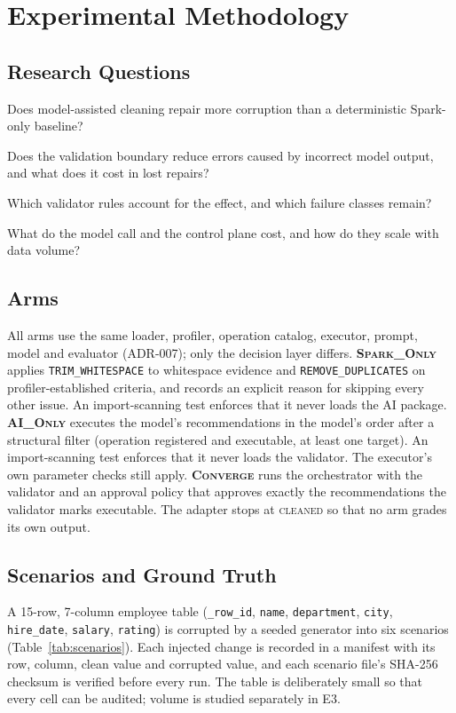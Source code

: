 \section{Experimental Methodology}
\label{sec:method}
\subsection{Research Questions}
\begin{description}[leftmargin=*,nosep,font=\normalfont\bfseries]
  \item[RQ1] Does model-assisted cleaning repair more corruption than a deterministic Spark-only baseline?
  \item[RQ2] Does the validation boundary reduce errors caused by incorrect model output, and what does it cost in lost repairs?
  \item[RQ3] Which validator rules account for the effect, and which failure classes remain?
  \item[RQ4] What do the model call and the control plane cost, and how do they scale with data volume?
\end{description}

\subsection{Arms}
All arms use the same loader, profiler, operation catalog, executor, prompt, model and evaluator (ADR-007); only the decision layer differs.
\textbf{\textsc{Spark\_Only}} applies \texttt{TRIM\_WHITESPACE} to whitespace evidence and \texttt{REMOVE\_DUPLICATES} on profiler-established criteria, and records an explicit reason for skipping every other issue. An import-scanning test enforces that it never loads the AI package.
\textbf{\textsc{AI\_Only}} executes the model's recommendations in the model's order after a structural filter (operation registered and executable, at least one target). An import-scanning test enforces that it never loads the validator. The executor's own parameter checks still apply.
\textbf{\textsc{Converge}} runs the orchestrator with the validator and an approval policy that approves exactly the recommendations the validator marks executable. The adapter stops at \textsc{cleaned} so that no arm grades its own output.

\subsection{Scenarios and Ground Truth}
A 15-row, 7-column employee table (\texttt{\_row\_id}, \texttt{name}, \texttt{department}, \texttt{city}, \texttt{hire\_date}, \texttt{salary}, \texttt{rating}) is corrupted by a seeded generator into six scenarios (Table~\ref{tab:scenarios}). Each injected change is recorded in a manifest with its row, column, clean value and corrupted value, and each scenario file's SHA-256 checksum is verified before every run. The table is deliberately small so that every cell can be audited; volume is studied separately in E3.

